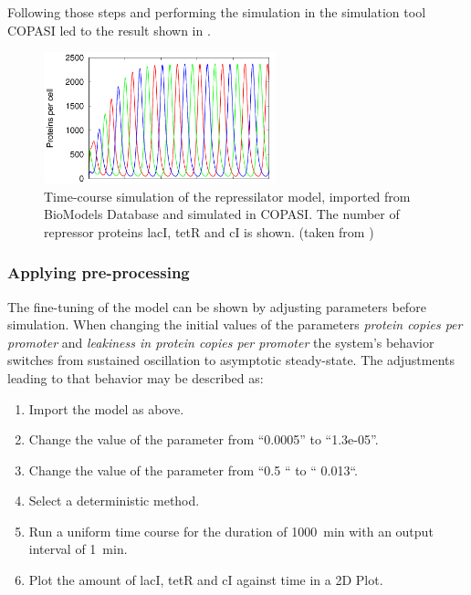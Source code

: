 Following those steps and performing the simulation in the simulation tool COPASI \citep{Hoops:2006} led to the result shown in . 

\begin{figure}
\centering
\includegraphics[width=0.6\textwidth]{images/simEx1.png}
\caption{Time-course simulation of the repressilator model, imported from BioModels Database and simulated in COPASI. The number of repressor proteins lacI, tetR and cI is shown. (taken from \cite{Waltemath:2010})}
\label{fig:simEx1}
\end{figure}

\subsubsection{Applying pre-processing}
\label{sec:examplePreprocessing}
The fine-tuning of the model can be shown by adjusting parameters before simulation. When changing the initial values of the parameters \emph{protein copies per promoter} and \emph{leakiness in protein copies per promoter} the system's behavior switches from sustained oscillation to asymptotic steady-state. The adjustments leading to that behavior may be described as: 

\begin{enumerate}
\item{Import the model as above.}
\item{Change the value of the parameter  from “0.0005” to “1.3e-05”. }
\item{Change the value of the parameter  from “0.5 “ to “ 0.013“.}
\item{Select a deterministic method.}
\item{Run a uniform time course for the duration of 1000~min with an output interval of 1~min.}
\item Plot the amount of lacI, tetR and cI against time in a 2D Plot.
\end{enumerate}


